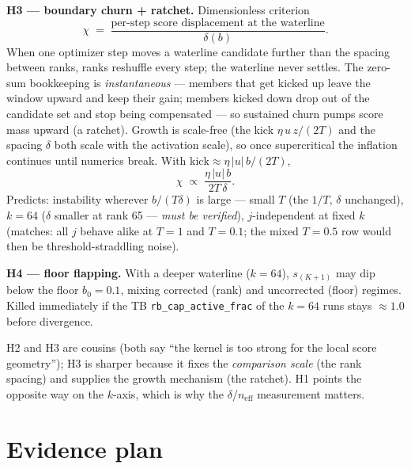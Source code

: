 \documentclass[11pt,a4paper]{article}
\newcommand{\code}[1]{\texttt{#1}}
\newcommand{\neff}{n_{\mathrm{eff}}}
\begin{document}
\textbf{H3 --- boundary churn + ratchet.} Dimensionless criterion
\[
  \chi \;=\; \frac{\text{per-step score displacement at the waterline}}
                  {\delta(b)}.
\]
When one optimizer step moves a waterline candidate further than the spacing
between ranks, ranks reshuffle every step; the waterline never settles. The
zero-sum bookkeeping is \emph{instantaneous} --- members that get kicked up
leave the window upward and keep their gain; members kicked down drop out of
the candidate set and stop being compensated --- so sustained churn pumps
score mass upward (a ratchet). Growth is scale-free (the kick
$\eta\,u\,z/(2T)$ and the spacing $\delta$ both scale with the activation
scale), so once supercritical the inflation continues until numerics break.
With $\text{kick} \approx \eta\,|u|\,b/(2T)$,
\[
  \chi \;\propto\; \frac{\eta\,|u|\,b}{2T\,\delta}.
\]
Predicts: instability wherever $b/(T\delta)$ is large --- small $T$ (the $1/T$,
$\delta$ unchanged), $k{=}64$ ($\delta$ smaller at rank 65 --- \emph{must be
verified}), $j$-independent at fixed $k$ (matches: all $j$ behave alike at
$T{=}1$ and $T{=}0.1$; the mixed $T{=}0.5$ row would then be
threshold-straddling noise).

\textbf{H4 --- floor flapping.} With a deeper waterline ($k{=}64$), $s_{(K+1)}$
may dip below the floor $b_0 = 0.1$, mixing corrected (rank) and uncorrected
(floor) regimes. Killed immediately if the TB \code{rb\_cap\_active\_frac} of
the $k{=}64$ runs stays $\approx 1.0$ before divergence.

H2 and H3 are cousins (both say ``the kernel is too strong for the local score
geometry''); H3 is sharper because it fixes the \emph{comparison scale} (the
rank spacing) and supplies the growth mechanism (the ratchet). H1 points the
opposite way on the $k$-axis, which is why the $\delta$/$\neff$ measurement
matters.

\section{Evidence plan}
\end{document}
